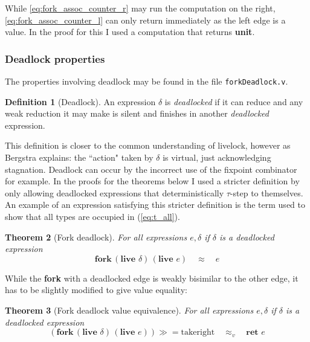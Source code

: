 \documentclass[12pt,twoside,notitlepage]{report}
\theoremstyle{plain}%
\newtheorem{thm}{Theorem}[section]
\theoremstyle{definition}
\newtheorem{defn}[thm]{Definition}
\theoremstyle{remark}
\begin{document}
While \ref{eq:fork_assoc_counter_r} may run the computation on the right, \ref{eq:fork_assoc_counter_l} can only return immediately as the left edge is a value. In the proof for this I used a computation that returns \textbf{unit}.

\subsubsection{Deadlock properties}
The properties involving deadlock may be found in the file \verb|forkDeadlock.v|.

\begin{defn}[Deadlock]
An expression $ \delta $ is \textit{deadlocked} if it can reduce and any weak reduction it may make is silent and finishes in another \textit{deadlocked} expression. 
\end{defn}

This definition is closer to the common understanding of livelock, however as Bergstra\cite{bergstra1984process} explains: the ``action" taken by $ \delta $ is virtual, just acknowledging stagnation. Deadlock can occur by the incorrect use of the fixpoint combinator for example. In the proofs for the theorems below I used a stricter definition by only allowing deadlocked expressions that deterministically $ \tau $-step to themselves. An example of an expression satisfying this stricter definition is the term used to show that all types are occupied in (\ref{eq:t_all}).
\begin{thm}[Fork deadlock]
For all expressions $ e, \delta$ if $ \delta $ is a deadlocked expression
\[  \textbf{fork}\,(\textbf{live }\delta)\,(\textbf{live }e)\quad \approx \quad e \]
\end{thm}

While the \textbf{fork} with a deadlocked edge is weakly bisimilar to the other edge, it has to be slightly modified to give value equality:

\begin{thm}[Fork deadlock value equivalence]
For all expressions $ e, \delta$ if $ \delta $ is a deadlocked expression
\[  (\textbf{fork}\,(\textbf{live }\delta)\,(\textbf{live }e))\gg=\text{takeright}\quad \approx_v \quad \textbf{ret }e \]
\end{thm}
\end{document}
